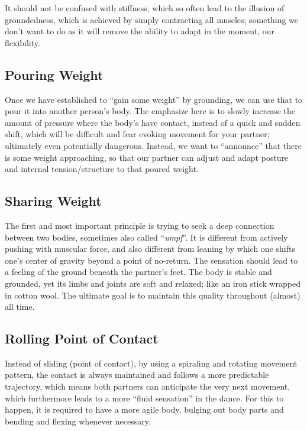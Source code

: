 It should not be confused with stiffness, which so often lead to the illusion of groundedness, which is achieved by simply contracting all muscles; something we don't want to do as it will remove the ability to adapt in the moment, our flexibility.

\subsection{Pouring Weight}\label{subsec:pouring-weight}

Once we have established to ``gain some weight'' by grounding, we can use that to pour it into another person's body.
The emphasize here is to slowly increase the amount of pressure where the body's have contact, instead of a quick and sudden shift, which will be difficult and fear evoking movement for your partner; ultimately even potentially dangerous.
Instead, we want to ``announce'' that there is some weight approaching, so that our partner can adjust and adapt posture and internal tension/structure to that poured weight.

\subsection{Sharing Weight}\label{subsec:sharing-weight}

The first and most important principle is trying to seek a deep connection between two bodies, sometimes also called ``\textit{umpf}''.
It is different from actively pushing with muscular force, and also different from leaning by which one shifts one's center of gravity beyond a point of no-return.
The sensation should lead to a feeling of the ground beneath the partner's feet.
The body is stable and grounded, yet its limbs and joints are soft and relaxed; like an iron stick wrapped in cotton wool.
The ultimate goal is to maintain this quality throughout (almost) all time.

\subsection{Rolling Point of Contact}\label{subsec:rolling-point-of-contact}

Instead of sliding (point of contact), by using a spiraling and rotating movement pattern, the contact is always maintained and follows a more predictable trajectory, which means both partners can anticipate the very next movement, which furthermore leads to a more ``fluid sensation'' in the dance.
For this to happen, it is required to have a more agile body, bulging out body parts and bending and flexing whenever necessary.

